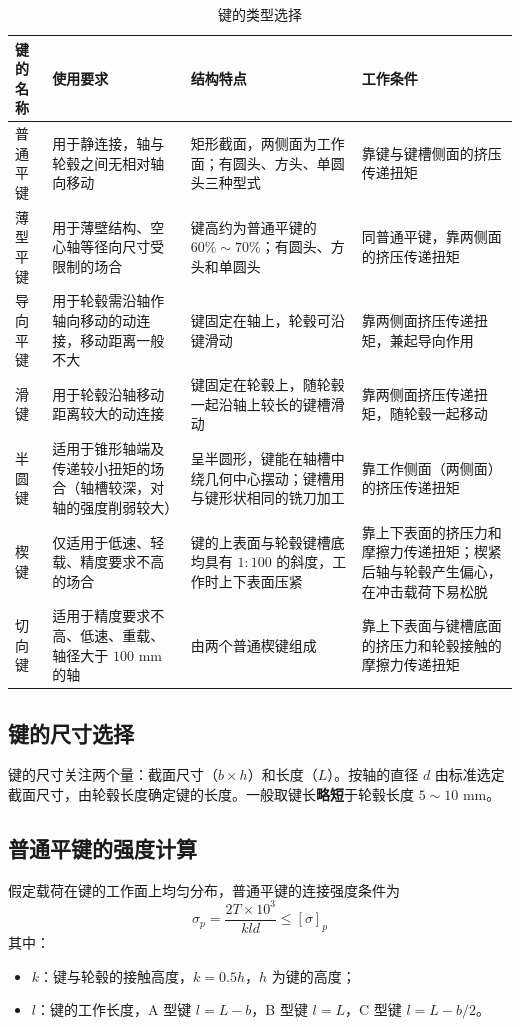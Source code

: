 \begin{table}[H]
\centering
\small
\setlength{\tabcolsep}{4pt}
\caption{键的类型选择}
\label{tab:轴毂:键的类型}
\begin{tabular}{p{1.5cm}p{4.1cm}p{4.5cm}p{4.1cm}}
	\toprule
	键的名称 & 使用要求 & 结构特点 & 工作条件 \\
	\midrule
	普通平键 & 用于静连接，轴与轮毂之间无相对轴向移动 & 矩形截面，两侧面为工作面；有圆头、方头、单圆头三种型式 & 靠键与键槽侧面的挤压传递扭矩 \\
	薄型平键 & 用于薄壁结构、空心轴等径向尺寸受限制的场合 & 键高约为普通平键的 $60\%\sim70\%$；有圆头、方头和单圆头 & 同普通平键，靠两侧面的挤压传递扭矩 \\
	导向平键 & 用于轮毂需沿轴作轴向移动的动连接，移动距离一般不大 & 键固定在轴上，轮毂可沿键滑动 & 靠两侧面挤压传递扭矩，兼起导向作用 \\
	滑键 & 用于轮毂沿轴移动距离较大的动连接 & 键固定在轮毂上，随轮毂一起沿轴上较长的键槽滑动 & 靠两侧面挤压传递扭矩，随轮毂一起移动 \\
	半圆键 & 适用于锥形轴端及传递较小扭矩的场合（轴槽较深，对轴的强度削弱较大） & 呈半圆形，键能在轴槽中绕几何中心摆动；键槽用与键形状相同的铣刀加工 & 靠工作侧面（两侧面）的挤压传递扭矩 \\
	楔键 & 仅适用于低速、轻载、精度要求不高的场合 & 键的上表面与轮毂键槽底均具有 $1:100$ 的斜度，工作时上下表面压紧 & 靠上下表面的挤压力和摩擦力传递扭矩；楔紧后轴与轮毂产生偏心，在冲击载荷下易松脱 \\
	切向键 & 适用于精度要求不高、低速、重载、轴径大于 $100$ mm 的轴 & 由两个普通楔键组成 & 靠上下表面与键槽底面的挤压力和轮毂接触的摩擦力传递扭矩 \\
	\bottomrule
\end{tabular}
\end{table}

\subsection{键的尺寸选择}
\label{sec:键的尺寸选择}

键的尺寸关注两个量：截面尺寸（$b\times h$）和长度（$L$）。按轴的直径 $d$ 由标准选定截面尺寸，由轮毂长度确定键的长度。一般取键长\textbf{略短}于轮毂长度 $5\sim10$ mm。

\subsection{普通平键的强度计算}
\label{sec:平键强度}

假定载荷在键的工作面上均匀分布，普通平键的连接强度条件为
\begin{equation}
	\sigma_p=\frac{2T\times10^{3}}{kld}\le[\sigma]_p
	\label{eq:轴毂:平键挤压强度}
\end{equation}
其中：
\begin{itemize}
	\item $k$：键与轮毂的接触高度，$k=0.5h$，$h$ 为键的高度；
	\item $l$：键的工作长度，A 型键 $l=L-b$，B 型键 $l=L$，C 型键 $l=L-b/2$。
\end{itemize}

